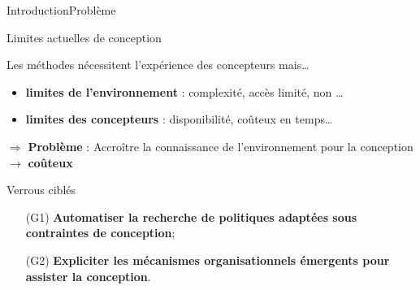 \begin{frame}{Introduction}{Problème}


    \begin{alertblock}{Limites actuelles de conception}

        Les méthodes nécessitent l'expérience des concepteurs mais\dots
        \begin{itemize}
            \item \textbf{limites de l'environnement} : complexité, accès limité, non \dots
            \item \textbf{limites des concepteurs} : disponibilité, coûteux en temps\dots
        \end{itemize}

        \vspace{-2ex}

        \begin{center}
            \begin{minipage}{13.5cm}
                \begin{block}{}
                    $\Longrightarrow$ \textbf{Problème} : Accroître la connaissance de l'environnement pour la conception $\rightarrow$ \textbf{coûteux}
                \end{block}
            \end{minipage}
        \end{center}

    \end{alertblock}

    \begin{exampleblock}{Verrous ciblés}
        \begin{enumerate}
            \item[\phantom{X} (G1)] \textbf{Automatiser la recherche de politiques adaptées sous contraintes de conception};
            \item[\phantom{X} (G2)] \textbf{Expliciter les mécanismes organisationnels émergents pour assister la conception}.
        \end{enumerate}
        
        \

        \centering
    \end{exampleblock}

\end{frame}
